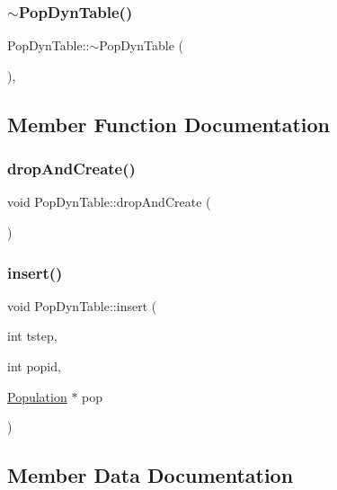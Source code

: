 \subsubsection{\texorpdfstring{$\sim$PopDynTable()}{~PopDynTable()}}
{\footnotesize\ttfamily Pop\+Dyn\+Table\+::$\sim$\+Pop\+Dyn\+Table (\begin{DoxyParamCaption}{ }\end{DoxyParamCaption})\hspace{0.3cm}{\ttfamily [default]}, {\ttfamily [noexcept]}}



\subsection{Member Function Documentation}
\mbox{\label{class_pop_dyn_table_a05cc504648b685a254f978cb904e37f5}} 
\subsubsection{\texorpdfstring{dropAndCreate()}{dropAndCreate()}}
{\footnotesize\ttfamily void Pop\+Dyn\+Table\+::drop\+And\+Create (\begin{DoxyParamCaption}{ }\end{DoxyParamCaption})}

\mbox{\label{class_pop_dyn_table_abb5f086db207701c5a7eb4547666b203}} 
\subsubsection{\texorpdfstring{insert()}{insert()}}
{\footnotesize\ttfamily void Pop\+Dyn\+Table\+::insert (\begin{DoxyParamCaption}\item[{int}]{tstep,  }\item[{int}]{popid,  }\item[{\mbox{\hyperlink{class_population}{Population}} $\ast$}]{pop }\end{DoxyParamCaption})}



\subsection{Member Data Documentation}
\mbox{\label{class_pop_dyn_table_a73d859709ce0ee0cab4040d6e985da13}} 
